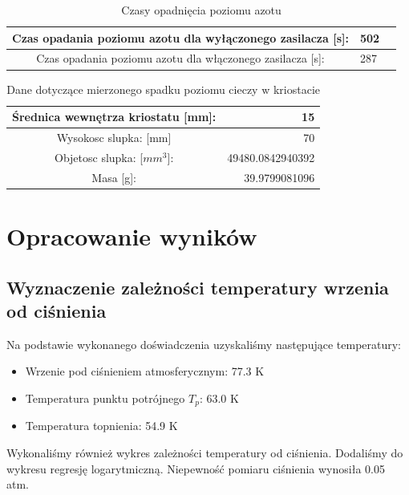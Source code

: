 \documentclass{article}
\begin{document}
\begin{table}[h!tbp]
\centering
\begin{tabular}{|c|l|r|}
\hline
Czas opadania poziomu azotu dla wyłączonego zasilacza [s]: & 502 \\ \hline
Czas opadania poziomu azotu dla włączonego zasilacza [s]:& 287 \\ \hline
\end{tabular}
\caption{Czasy opadnięcia poziomu azotu}
\label{}
\end{table}

\begin{table}[h!tbp]
\centering
\begin{tabular}{|c|l|l|r|}
\hline
\multicolumn{ 3}{|c|}{Średnica wewnętrza kriostatu [mm]:} & 15 \\ \hline
\multicolumn{ 3}{|c|}{Wysokosc slupka: [mm]} & 70 \\ \hline
\multicolumn{ 3}{|c|}{Objetosc slupka: [$mm^3$]:} & 49480.0842940392 \\ \hline
\multicolumn{ 3}{|c|}{Masa [g]:} & 39.9799081096 \\ \hline
\end{tabular}
\caption{Dane dotyczące mierzonego spadku poziomu cieczy w kriostacie}
\label{}
\end{table}




\section{Opracowanie wyników}
\subsection{Wyznaczenie zależności temperatury wrzenia od ciśnienia}
Na podstawie wykonanego doświadczenia uzyskaliśmy następujące temperatury:
\begin{itemize}
\item Wrzenie pod ciśnieniem atmosferycznym: 77.3 K
\item Temperatura punktu potrójnego $T_{p}$: 63.0 K
\item Temperatura topnienia: 54.9 K
\end{itemize}

Wykonaliśmy również wykres zależności temperatury od ciśnienia. Dodaliśmy do wykresu regresję logarytmiczną. Niepewność pomiaru ciśnienia wynosiła 0.05 atm.
\end{document}

